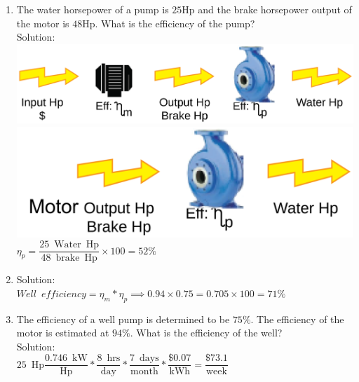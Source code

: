 \documentclass{article}
\begin{document}
\begin{enumerate}
\item The water horsepower of a pump is $25 \mathrm{Hp}$ and the brake horsepower output of the motor is $48 \mathrm{Hp}$. What is the efficiency of the pump?\\
  \vspace{0.2cm}
Solution:\\
  \vspace{0.2cm}
 \vspace{0.32cm}\includegraphics[scale=0.08]{PumpProblem}\\
 \vspace{0.2cm}
 \includegraphics[scale=0.4]{PumpingProblemPump}
 \vspace{0.2cm}
$\eta_p=\dfrac{25 \mathrm{\enspace Water \enspace Hp}}{48 \mathrm{\enspace brake \enspace Hp}} \times 100=\boxed{52 \%}$
  \vspace{0.4cm}
 \item Solution:\\ 
 \vspace{0.2cm}
$Well \enspace efficiency=\eta_m * \eta_p \implies 0.94 \times 0.75=0.705 \times 100=\boxed{71 \%}$
 \vspace{0.2cm}

\item The efficiency of a well pump is determined to be $75 \%$. The efficiency of the motor is estimated at $94 \%$. What is the efficiency of the well?\\
Solution:\\
\vspace{0.4cm}
$25 \enspace \mathrm{Hp}\dfrac{0.746 \enspace \mathrm{kW}}{\mathrm{Hp}}*\dfrac{8 \enspace \mathrm{hrs}}{\mathrm{day}}*\dfrac{7 \enspace \mathrm{days}}{\mathrm{month}}*\dfrac{\$0.07}{\mathrm{kWh}}=\boxed{\dfrac{\$73.1}{\mathrm{week}}}$\\
\vspace{0.2cm}


\end{enumerate}
\end{document}
